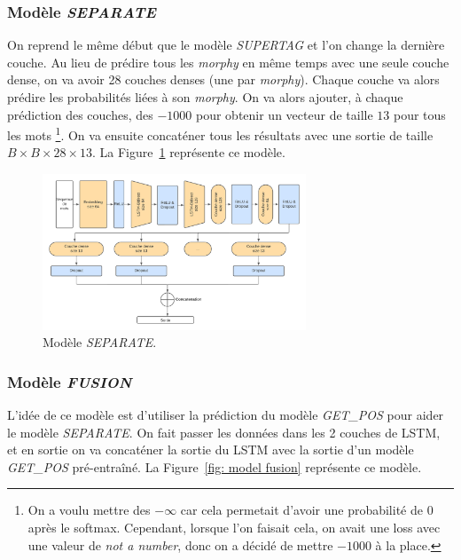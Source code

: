 \documentclass[a4paper]{article}
\begin{document}
\subsubsection{Modèle \textit{SEPARATE}}

On reprend le même début que le modèle \textit{SUPERTAG} et l'on change la dernière couche. Au lieu de prédire tous les 
\textit{morphy} en même temps avec une seule couche dense, on va avoir 28 couches denses (une par \textit{morphy}). Chaque couche
va alors prédire les probabilités liées à son \textit{morphy}. On va alors ajouter, à chaque prédiction des couches, des $- 1000$
pour obtenir un vecteur de taille $13$ pour tous les mots
\footnote{On a voulu mettre des $-\infty$ car cela permetait d'avoir une probabilité de $0$ après le softmax. Cependant, 
lorsque l'on faisait cela, on avait une loss avec une valeur de \textit{not a number}, donc on a décidé de mettre $-1000$ à 
la place.}.
On va ensuite concaténer tous les résultats avec une sortie de 
taille $B \times B \times 28 \times 13$. La Figure~\ref{fig: model separate} représente ce modèle.

\begin{figure}[H]
    \centering
    \includegraphics[width=0.7\textwidth]{get_morphy_separate.png}
    \caption{Modèle \textit{SEPARATE}.}
    \label{fig: model separate}
\end{figure}

\subsubsection{Modèle \textit{FUSION}}

L'idée de ce modèle est d'utiliser la prédiction du modèle \textit{GET\_POS} pour aider le modèle \textit{SEPARATE}.
On fait passer les données dans les 2 couches de LSTM, et en sortie on va concaténer la sortie du LSTM avec la sortie
d'un modèle \textit{GET\_POS} pré-entraîné.
La Figure~\ref{fig: model fusion} représente ce modèle.
\end{document}

